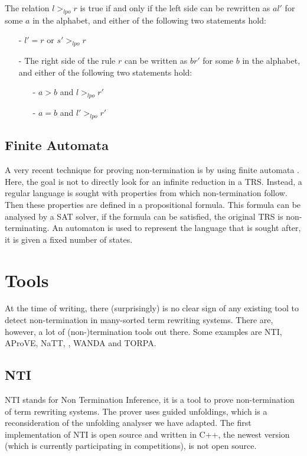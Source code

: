 The relation $l >_{\textit{lpo}} r$ is true if and only if the left side can be rewritten as $al'$ for some $a$ in the alphabet, and either of the following two statements hold: 
\begin{itemize}
    \itemsep 0em
    \item[-] $l' = r$ or $s' >_{\textit{lpo}} r$
    \item[-] The right side of the rule $r$ can be written as $br'$ for some $b$ in the alphabet, and either of the following two statements hold:
    \begin{itemize}
        \itemsep 0em
        \item[-] $a > b$ and $l >_{\textit{lpo}} r'$
        \item[-] $a = b$ and $l' >_{\textit{lpo}} r'$
    \end{itemize}
\end{itemize}

\subsection*{Finite Automata}
A very recent technique for proving non-termination is by using finite automata \cite{ENDRULLIS:AUTOMATA}. Here, the goal is not to directly look for an infinite reduction in a TRS. Instead, a regular language is sought with properties from which non-termination follow. Then these properties are defined in a propositional formula. This formula can be analysed by a SAT solver, if the formula can be satisfied, the original TRS is non-terminating. An automaton is used to represent the language that is sought after, it is given a fixed number of states. 

\section{Tools}
At the time of writing, there (surprisingly) is no clear sign of any existing tool to detect non-termination in many-sorted term rewriting systems. There are, however, a lot of (non-)termination tools out there. Some examples are NTI, AProVE, NaTT, \TTTT, WANDA and TORPA.

\subsection*{NTI}
NTI\cite{payet2018guided} stands for Non Termination Inference, it is a tool to prove non-termination of term rewriting systems. The prover uses guided unfoldings, which is a reconsideration of the unfolding analyser we have adapted\cite{Payet:Unfolding}. The first implementation of NTI is open source and written in C++, the newest version (which is currently participating in competitions), is not open source\cite{PAYET:NTI}.

